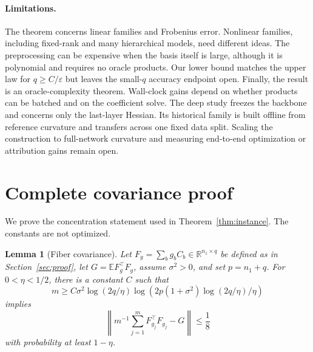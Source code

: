 \documentclass{article}
\newtheorem{lemma}[theorem]{Lemma}
\theoremstyle{remark}
\newcommand{\E}{\mathbb E}
\newcommand{\eps}{\varepsilon}
\newcommand{\1}{\mathbf 1}
\begin{document}
\paragraph{Limitations.}
The theorem concerns linear families and Frobenius error.  Nonlinear families, including fixed-rank and many hierarchical models, need different ideas.  The preprocessing can be expensive when the basis itself is large, although it is polynomial and requires no oracle products.  Our lower bound matches the upper law for $q\ge C/\eps$ but leaves the small-$q$ accuracy endpoint open.  Finally, the result is an oracle-complexity theorem.  Wall-clock gains depend on whether products can be batched and on the coefficient solve.  The deep study freezes the backbone and concerns only the last-layer Hessian.  Its historical family is built offline from reference curvature and transfers across one fixed data split.  Scaling the construction to full-network curvature and measuring end-to-end optimization or attribution gains remain open.




\appendix

\section{Complete covariance proof}
\label{app:concentration}

We prove the concentration statement used in Theorem~\ref{thm:instance}.  The constants are not optimized.

\begin{lemma}[Fiber covariance]
\label{lem:fiber-cov}
Let $F_g=\sum_bg_bC_b\in\mathbb R^{n_1\times q}$ be defined as in Section~\ref{sec:proof}, let $G=\E F_g^\top F_g$, assume $\sigma^2>0$, and set $p=n_1+q$.  For $0<\eta<1/2$, there is a constant $C$ such that \[ m\ge C\sigma^2\log(2q/\eta) \log\!\left(2p(1+\sigma^2)\log(2q/\eta)/\eta\right) \] implies \[ \left\|m^{-1}\sum_{j=1}^mF_{g_j}^\top F_{g_j}-G\right\|\le\frac18 \] with probability at least $1-\eta$.
\end{lemma}
\end{document}
